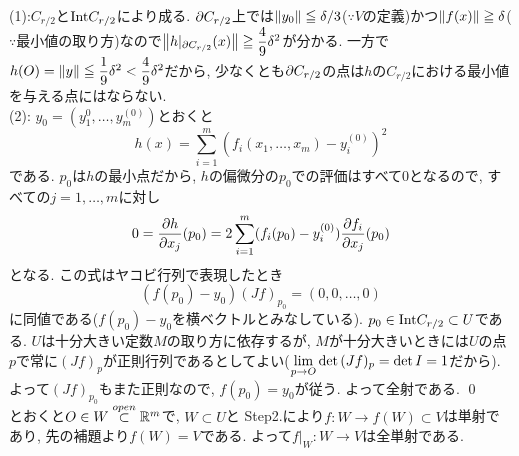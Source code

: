 \prf  (1):$C_{r/2}$と$\mathrm{Int}C_{r/2}$により成る. $\partial C_{r/2}$上では$\left\| y_0 \right\|\leqq \delta/3$($\because V$の定義)かつ$\left\| f(x) \right\|\geqq \delta$($\because$最小値の取り方)なので$\left\| h|_{\partial C_{r/2}}(x) \right\|\geqq \dfrac{4}{9}\delta^2$が分かる. 一方で$h(O) = \left\| y \right\| \leqq \dfrac{1}{9}\delta^2 < \dfrac{4}{9}\delta^2$だから, 少なくとも$\partial C_{r/2}$の点は$h$の$C_{r/2}$における最小値を与える点にはならない. \\
(2): $y_0 = (y_1^{0},\dots, y_m^{(0)})$とおくと
\[h(x) = \sum_{i=1}^{m} (f_i(x_1,\dots, x_m) -y_i^{(0)})^2\]
である. $p_0$は$h$の最小点だから, $h$の偏微分の$p_0$での評価はすべて$0$となるので, すべての$j=1,\dots, m$に対し
\[0 = \dfrac{\partial h}{\partial x_j}(p_0) = 2\sum_{i=1}^{m} (f_i(p_0) - y_i^{(0)})\dfrac{\partial f_i}{\partial x_j}(p_0)\]
となる. この式はヤコビ行列で表現したとき
\[(f(p_0) - y_0)(Jf)_{p_0} = (0,0,\dots, 0)\]
に同値である($f(p_0) - y_0$を横ベクトルとみなしている). $p_0 \in \mathrm{Int} C_{r/2} \subset U$である. $U$は十分大きい定数$M$の取り方に依存するが, $M$が十分大きいときには$U$の点$p$で常に$(Jf)_{p}$が正則行列であるとしてよい($\displaystyle\lim_{p\to O}\det{(Jf)_{p}} = \det{I} = 1$だから). よって$(Jf)_{p_0}$もまた正則なので, $f(p_0) = y_0$が従う. よって全射である. \qed  \\
とおくと$O\in W \overset{open}{\subset} \mathbb{R}^m$で, $W\subset U$と Step2.により$f:W\to f(W) \subset V$は単射であり, 先の補題より$f(W) = V$である. よって$f|_{W}:W\to V$は全単射である.


